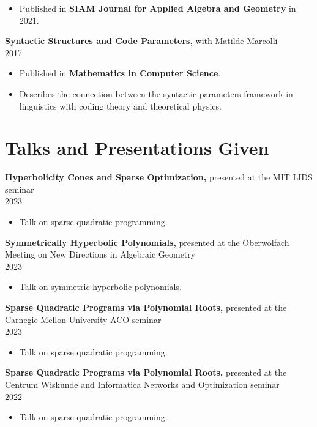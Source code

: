 \documentclass[margin]{res}
\begin{document}
\begin{resume}
\begin{itemize}
\item Published in \textbf{SIAM Journal for Applied Algebra and Geometry} in 2021.
\end{itemize}
{\bf  Syntactic Structures and Code Parameters,} with Matilde Marcolli \\ 2017
\begin{itemize} \itemsep -2pt %
\item Published in \textbf{Mathematics in Computer Science}.
\item Describes the connection between the syntactic parameters framework in linguistics with coding theory and theoretical physics.
\end{itemize}


\section{Talks and Presentations Given}

{\bf  Hyperbolicity Cones and Sparse Optimization,} presented at the MIT LIDS seminar \\ 2023 
\begin{itemize} \itemsep -2pt %
\item Talk on sparse quadratic programming.
\end{itemize}

{\bf  Symmetrically Hyperbolic Polynomials,} presented at the \"Oberwolfach Meeting on New Directions in Algebraic Geometry \\ 2023 
\begin{itemize} \itemsep -2pt %
\item Talk on symmetric hyperbolic polynomials.
\end{itemize}

{\bf  Sparse Quadratic Programs via Polynomial Roots,} presented at the Carnegie Mellon University ACO seminar \\ 2023 
\begin{itemize} \itemsep -2pt %
\item Talk on sparse quadratic programming.
\end{itemize}

{\bf  Sparse Quadratic Programs via Polynomial Roots,} presented at the Centrum Wiskunde and Informatica Networks and Optimization seminar \\ 2022 
\begin{itemize} \itemsep -2pt %
\item Talk on sparse quadratic programming.
\end{itemize}


\end{resume}
\end{document}

